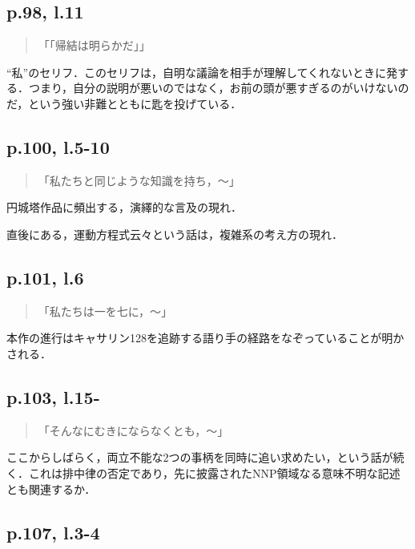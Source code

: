 \documentclass[10pt, a5paper, twoside]{ltjsarticle}
\begin{document}
        \subsection{p.98, l.11}

            \begin{quote}
                「「帰結は明らかだ」」
            \end{quote}

            “私”のセリフ．このセリフは，自明な議論を相手が理解してくれないときに発する．つまり，自分の説明が悪いのではなく，お前の頭が悪すぎるのがいけないのだ，という強い非難とともに匙を投げている．

        \subsection{p.100, l.5-10}

            \begin{quote}
                「私たちと同じような知識を持ち，〜」
            \end{quote}

            円城塔作品に頻出する，演繹的な言及の現れ．

            直後にある，運動方程式云々という話は，複雑系の考え方の現れ．

        \subsection{p.101, l.6}

            \begin{quote}
                「私たちは一を七に，〜」
            \end{quote}

            本作の進行はキャサリン128を追跡する語り手の経路をなぞっていることが明かされる．

        \subsection{p.103, l.15-}

            \begin{quote}
                「そんなにむきにならなくとも，〜」
            \end{quote}

            ここからしばらく，両立不能な2つの事柄を同時に追い求めたい，という話が続く．これは排中律の否定であり，先に披露されたNNP領域なる意味不明な記述とも関連するか．

        \subsection{p.107, l.3-4}
\end{document}
